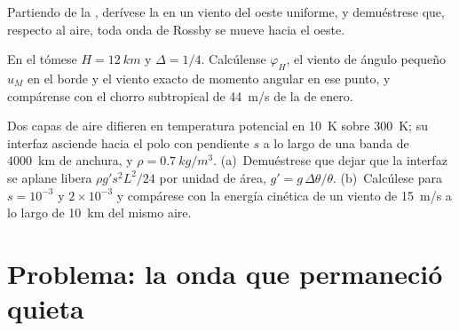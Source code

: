 \begin{exercise}[$\star\star\star$]\label{exo:b3:atmospheric-dynamics:10}
Partiendo de la , derívese la
 en un viento del oeste
uniforme, y demuéstrese que, respecto al aire, toda onda de Rossby se mueve hacia el oeste.
\end{exercise}

\begin{exercise}[$\star\star\star$]\label{exo:b3:atmospheric-dynamics:11}
En el  tómese $H = \qty{12}{km}$ y $\Delta = 1/4$. Calcúlense
$\varphi_H$, el viento de ángulo pequeño $u_M$ en el borde y el viento exacto
de momento angular en ese punto, y compárense con el chorro subtropical de
\qty{44}{m/s} de la  de enero.
\end{exercise}

\begin{exercise}[$\star\star\star$]\label{exo:b3:atmospheric-dynamics:12}
Dos capas de aire difieren en temperatura potencial en \qty{10}{K} sobre
\qty{300}{K}; su interfaz asciende hacia el polo con pendiente $s$
a lo largo de una banda de \qty{4000}{km} de anchura, y $\rho = \qty{0.7}{kg/m^3}$. (a)~Demuéstrese
que dejar que la interfaz se aplane libera $\rho g' s^2L^2/24$ por unidad
de área, $g' = g\,\Delta\theta/\theta$. (b)~Calcúlese para $s = 10^{-3}$ y
$2\times10^{-3}$ y compárese con la energía cinética de un viento de \qty{15}{m/s}
a lo largo de \qty{10}{km} del mismo aire.
\end{exercise}

\section{Problema: la onda que permaneció quieta}

